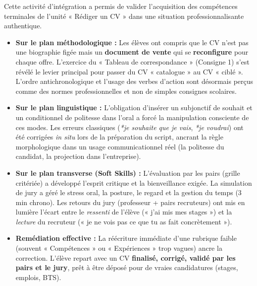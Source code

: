 \documentclass[11pt]{article}
\newcounter{popsec}
\newcounter{popsub}
\newcommand{\courssub}[1]{%
  \stepcounter{popsub}%
  \par\vspace{9pt}\noindent{\popxbold\fontsize{11.5}{13}\selectfont\color{popink}{\color{poporange}\thepopsec.\thepopsub}\hspace{6pt}#1}\par\nopagebreak\vspace{4pt}
}
\begin{document}
\courssub{Bilan de l'activité}
Cette activité d'intégration a permis de valider l'acquisition des compétences terminales de l'unité « Rédiger un CV » dans une situation professionnalisante authentique.

\begin{itemize}
    \item \textbf{Sur le plan méthodologique :} Les élèves ont compris que le CV n'est pas une biographie figée mais un \textbf{document de vente} qui se \textbf{reconfigure} pour chaque offre. L'exercice du « Tableau de correspondance » (Consigne 1) s'est révélé le levier principal pour passer du CV « catalogue » au CV « ciblé ». L'ordre antichronologique et l'usage des verbes d'action sont désormais perçus comme des normes professionnelles et non de simples consignes scolaires.
    \item \textbf{Sur le plan linguistique :} L'obligation d'insérer un subjonctif de souhait et un conditionnel de politesse dans l'oral a forcé la manipulation consciente de ces modes. Les erreurs classiques (\emph{*je souhaite que je vais}, \emph{*je voudrai}) ont été corrigées \textit{in situ} lors de la préparation du script, ancrant la règle morphologique dans un usage communicationnel réel (la politesse du candidat, la projection dans l'entreprise).
    \item \textbf{Sur le plan transverse (Soft Skills) :} L'évaluation par les pairs (grille critériée) a développé l'esprit critique et la bienveillance exigée. La simulation de jury a géré le stress oral, la posture, le regard et la gestion du temps (3 min chrono). Les retours du jury (professeur + pairs recruteurs) ont mis en lumière l'écart entre le \emph{ressenti} de l'élève (« j'ai mis mes stages ») et la \emph{lecture} du recruteur (« je ne vois pas ce que tu as fait concrètement »).
    \item \textbf{Remédiation effective :} La réécriture immédiate d'une rubrique faible (souvent « Compétences » ou « Expériences » trop vagues) ancre la correction. L'élève repart avec un CV \textbf{finalisé, corrigé, validé par les pairs et le jury}, prêt à être déposé pour de vraies candidatures (stages, emplois, BTS).
\end{itemize}
\end{document}
